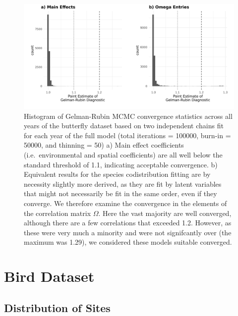 \documentclass[
]{article}
\begin{document}
\begin{figure}
\centering
\includegraphics{ButterflyMarkdowns/ButterflySIFigs/ButterflyConvergence_GR.png}
\caption{Histogram of Gelman-Rubin MCMC convergence statistics across
all years of the butterfly dataset based on two independent chains fit
for each year of the full model (total iterations = 100000, burn-in =
50000, and thinning = 50) a) Main effect coefficients
(i.e.~environmental and spatial coefficients) are all well below the
standard threshold of 1.1, indicating acceptable convergence. b)
Equivalent results for the species codistribution fitting are by
necessity slightly more derived, as they are fit by latent variables
that might not necessarily be fit in the same order, even if they
converge. We therefore examine the convergence in the elements of the
correlation matrix \(\Omega\). Here the vast majority are well
converged, although there are a few correlations that exceeded 1.2.
However, as these were very much a minority and were not signifcantly
over (the maximum was 1.29), we considered these models suitable
converged.}
\end{figure}

\hypertarget{bird-dataset}{%
\section{Bird Dataset}\label{bird-dataset}}

\hypertarget{distribution-of-sites-1}{%
\subsection{Distribution of Sites}\label{distribution-of-sites-1}}
\end{document}
